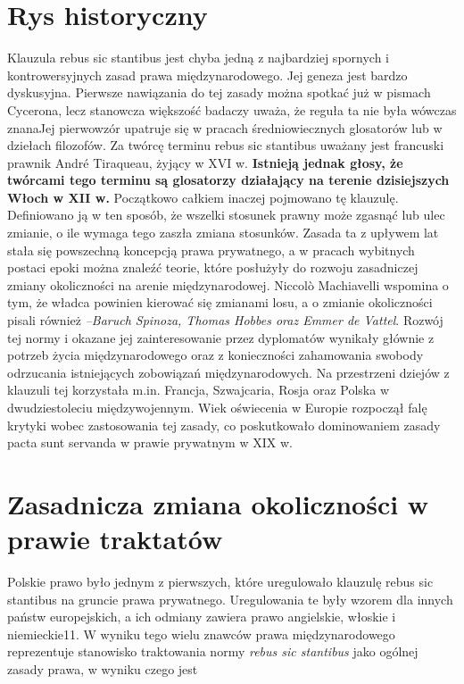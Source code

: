 \documentclass[12pt; a4paper; titlepage]{article}
\begin{document}
\section {Rys historyczny}
\hspace{15pt} Klauzula rebus sic stantibus jest chyba jedną z najbardziej spornych i kontrowersyjnych zasad prawa międzynarodowego. Jej geneza jest bardzo dyskusyjna. Pierwsze
nawiązania do tej zasady można spotkać już w  pismach Cycerona, lecz stanowcza
większość badaczy uważa, że reguła ta nie była wówczas znanaJej pierwowzór upatruje się w pracach średniowiecznych glosatorów lub w dziełach filozofów. Za twórcę
terminu rebus sic stantibus uważany jest francuski prawnik André Tiraqueau, żyjący
w XVI w.
\textbf {Istnieją jednak głosy, że twórcami tego terminu są glosatorzy działający na
terenie dzisiejszych Włoch w XII w.} Początkowo całkiem inaczej pojmowano tę klauzulę.
Definiowano ją w ten sposób, że wszelki stosunek prawny może zgasnąć lub ulec zmianie, o ile wymaga tego zaszła zmiana stosunków. Zasada ta z upływem lat stała się
powszechną koncepcją prawa prywatnego, a w pracach wybitnych postaci epoki można
znaleźć teorie, które posłużyły do rozwoju zasadniczej zmiany okoliczności na arenie
międzynarodowej. Niccolò Machiavelli wspomina o tym, że władca powinien kierować
się zmianami losu, a o zmianie okoliczności pisali również 
\textit{–Baruch Spinoza, Thomas Hobbes oraz Emmer de Vattel}. Rozwój tej normy i okazane jej zainteresowanie przez
dyplomatów wynikały głównie z potrzeb życia międzynarodowego oraz z konieczności
zahamowania swobody odrzucania istniejących zobowiązań międzynarodowych.
Na przestrzeni dziejów z klauzuli tej korzystała m.in. Francja, Szwajcaria, Rosja oraz
Polska w dwudziestoleciu międzywojennym. Wiek oświecenia w Europie rozpoczął falę
krytyki wobec zastosowania tej zasady, co poskutkowało dominowaniem zasady pacta
sunt servanda w prawie prywatnym w XIX w.
\section{Zasadnicza zmiana okoliczności w prawie traktatów}
\hspace{15pt} Polskie prawo było jednym z  pierwszych, które uregulowało klauzulę rebus sic
stantibus na gruncie prawa prywatnego. Uregulowania te były wzorem dla innych
państw europejskich, a ich odmiany zawiera prawo angielskie, włoskie i niemieckie11.
W wyniku tego wielu znawców prawa międzynarodowego reprezentuje stanowisko
traktowania normy \textit{rebus sic stantibus} jako ogólnej zasady prawa, w wyniku czego jest
\end{document}
